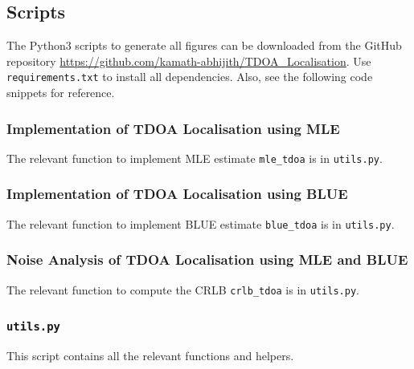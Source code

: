 \documentclass[11pt]{article}
\begin{document}

\appendix

\newpage
\subsection*{Scripts}
The Python3 scripts to generate all figures can be downloaded from the GitHub repository \url{https://github.com/kamath-abhijith/TDOA_Localisation}. Use \texttt{requirements.txt} to install all dependencies. Also, see the following code snippets for reference.

\newpage
\subsubsection*{Implementation of TDOA Localisation using MLE}

The relevant function to implement MLE estimate \texttt{mle\_tdoa} is in \texttt{utils.py}.



\subsubsection*{Implementation of TDOA Localisation using BLUE}

The relevant function to implement BLUE estimate \texttt{blue\_tdoa} is in \texttt{utils.py}.



\subsubsection*{Noise Analysis of TDOA Localisation using MLE and BLUE}

The relevant function to compute the CRLB \texttt{crlb\_tdoa} is in \texttt{utils.py}.



\subsubsection*{\texttt{utils.py}}

This script contains all the relevant functions and helpers.

\end{document}
